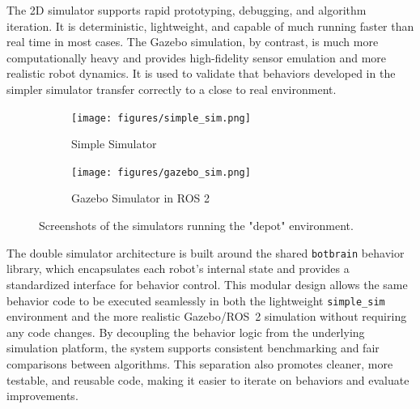 The 2D simulator supports rapid prototyping, debugging, and algorithm iteration. It is deterministic, lightweight, and capable of much running faster than real time in most cases. The Gazebo simulation, by contrast, is much more computationally heavy and provides high-fidelity sensor emulation and more realistic robot dynamics. It is used to validate that behaviors developed in the simpler simulator transfer correctly to a close to real environment. \\


\begin{figure}[h]
    \centering
    \begin{subfigure}[b]{0.45\textwidth}
        \centering
        \texttt{[image: figures/simple\_sim.png]}
        \caption{Simple Simulator}
    \end{subfigure}
    \hfill
    \begin{subfigure}[b]{0.45\textwidth}
        \centering
        \texttt{[image: figures/gazebo\_sim.png]}
        \caption{Gazebo Simulator in ROS 2}
    \end{subfigure}
    \caption{Screenshots of the simulators running the "depot" environment.}
    \label{fig:simulators}
\end{figure}

The double simulator architecture is built around the shared \texttt{botbrain} behavior library, which encapsulates each robot’s internal state and provides a standardized interface for behavior control. This modular design allows the same behavior code to be executed seamlessly in both the lightweight \texttt{simple\_sim} environment and the more realistic Gazebo/ROS~2 simulation without requiring any code changes. By decoupling the behavior logic from the underlying simulation platform, the system supports consistent benchmarking and fair comparisons between algorithms. This separation also promotes cleaner, more testable, and reusable code, making it easier to iterate on behaviors and evaluate improvements.\\
